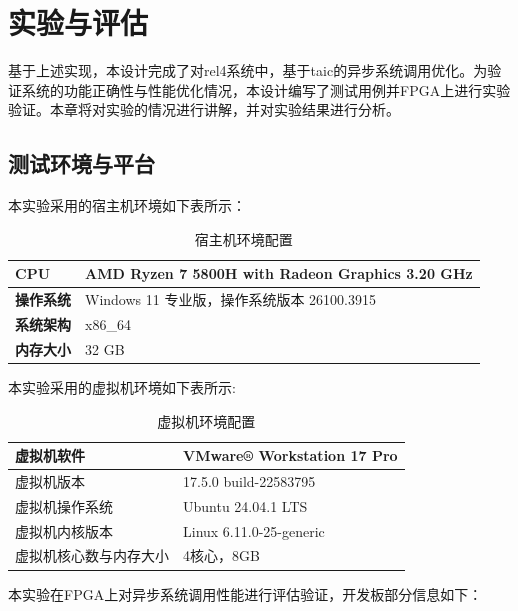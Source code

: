 \chapter{实验与评估}

基于上述实现，本设计完成了对rel4系统中，基于taic的异步系统调用优化。为验证系统的功能正确性与性能优化情况，本设计编写了测试用例并FPGA上进行实验验证。本章将对实验的情况进行讲解，并对实验结果进行分析。

\section{测试环境与平台}

本实验采用的宿主机环境如下表所示：

\begin{table}[htbp]
\centering
\renewcommand{\arraystretch}{1.2}
\begin{tabular}{|l|l|}
\hline
\textbf{CPU} & AMD Ryzen 7 5800H with Radeon Graphics 3.20 GHz \\
\hline
\textbf{操作系统} & Windows 11 专业版，操作系统版本	26100.3915 \\
\hline
\textbf{系统架构} & x86\_64 \\
\hline
\textbf{内存大小} & 32 GB \\
\hline
\end{tabular}
\caption{宿主机环境配置}
\label{tab:experiment-platform}
\end{table}


本实验采用的虚拟机环境如下表所示:

\begin{table}[htbp]
\centering
\renewcommand{\arraystretch}{1.2}
\begin{tabular}{|l|l|}
\hline
虚拟机软件 & VMware® Workstation 17 Pro \\
\hline
虚拟机版本 & 17.5.0 build-22583795 \\
\hline
虚拟机操作系统 & Ubuntu 24.04.1 LTS \\
\hline
虚拟机内核版本 & Linux 6.11.0-25-generic \\
\hline
虚拟机核心数与内存大小 & 4核心，8GB \\
\hline
\end{tabular}
\caption{虚拟机环境配置}
\label{tab:vmware-platform}
\end{table}

本实验在FPGA上对异步系统调用性能进行评估验证，开发板部分信息如下：

